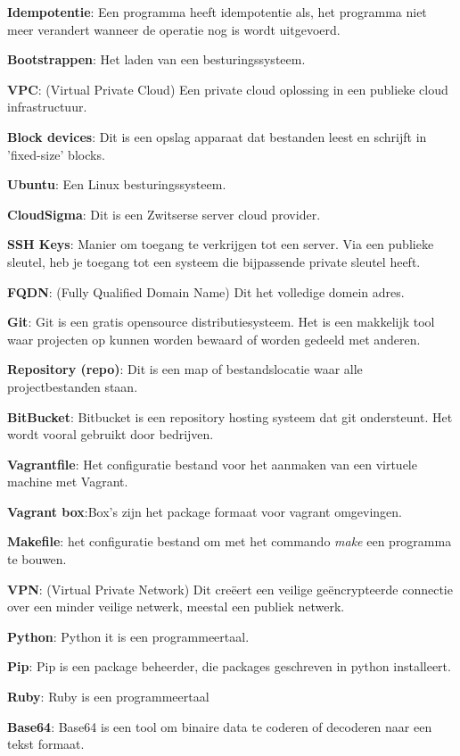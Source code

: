 \textbf{Idempotentie}: Een programma heeft idempotentie als, het programma niet meer verandert wanneer de operatie nog is wordt uitgevoerd.

\textbf{Bootstrappen}: Het laden van een besturingssysteem.

\textbf{VPC}: (Virtual Private Cloud) Een private cloud oplossing in een publieke cloud infrastructuur.

\textbf{Block devices}: Dit is een opslag apparaat dat bestanden leest en schrijft in 'fixed-size' blocks.	

\textbf{Ubuntu}: Een Linux besturingssysteem.

\textbf{CloudSigma}: Dit is een Zwitserse server cloud provider.

\textbf{SSH Keys}: Manier om toegang te verkrijgen tot een server. Via een publieke sleutel, heb je toegang tot een systeem die bijpassende private sleutel heeft.

\textbf{FQDN}: (Fully Qualified Domain Name) Dit het volledige domein adres.

\textbf{Git}: Git is een gratis opensource distributiesysteem. Het is een makkelijk tool waar projecten op kunnen worden bewaard of worden gedeeld met anderen.

\textbf{Repository (repo)}: Dit is een map of bestandslocatie waar alle projectbestanden staan.

\textbf{BitBucket}: Bitbucket is een repository hosting systeem dat git ondersteunt. Het wordt vooral gebruikt door bedrijven.

\textbf{Vagrantfile}: Het configuratie bestand voor het aanmaken van een virtuele machine met Vagrant.

\textbf{Vagrant box}:Box's zijn het package formaat voor vagrant omgevingen.

\textbf{Makefile}: het configuratie bestand om met het commando \textit{make} een programma te bouwen.

\textbf{VPN}: (Virtual Private Network) Dit creëert een veilige geëncrypteerde connectie over een minder veilige netwerk, meestal een publiek netwerk.

\textbf{Python}: Python it is een programmeertaal.

\textbf{Pip}: Pip is een package beheerder, die packages geschreven in python installeert.

\textbf{Ruby}: Ruby is een programmeertaal

\textbf{Base64}: Base64 is een tool om binaire data te coderen of decoderen naar een tekst formaat.
